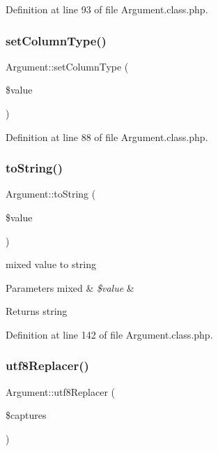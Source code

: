 Definition at line 93 of file Argument.\+class.\+php.

\hypertarget{classArgument_a849c6abe0d16f2fdf21c38db6844bd9d}{}\label{classArgument_a849c6abe0d16f2fdf21c38db6844bd9d} 
\subsubsection{\texorpdfstring{set\+Column\+Type()}{setColumnType()}}
{\footnotesize\ttfamily Argument\+::set\+Column\+Type (\begin{DoxyParamCaption}\item[{}]{\$value }\end{DoxyParamCaption})}



Definition at line 88 of file Argument.\+class.\+php.

\hypertarget{classArgument_a6fa3a8b473d05a02c7746a143e51ef81}{}\label{classArgument_a6fa3a8b473d05a02c7746a143e51ef81} 
\subsubsection{\texorpdfstring{to\+String()}{toString()}}
{\footnotesize\ttfamily Argument\+::to\+String (\begin{DoxyParamCaption}\item[{}]{\$value }\end{DoxyParamCaption})}

mixed value to string 
\begin{DoxyParams}[1]{Parameters}
mixed & {\em \$value} & \\
\hline
\end{DoxyParams}
\begin{DoxyReturn}{Returns}
string 
\end{DoxyReturn}


Definition at line 142 of file Argument.\+class.\+php.

\hypertarget{classArgument_aaf7f8b67195ed2e1b404339d107d6a1c}{}\label{classArgument_aaf7f8b67195ed2e1b404339d107d6a1c} 
\subsubsection{\texorpdfstring{utf8\+Replacer()}{utf8Replacer()}}
{\footnotesize\ttfamily Argument\+::utf8\+Replacer (\begin{DoxyParamCaption}\item[{}]{\$captures }\end{DoxyParamCaption})}



